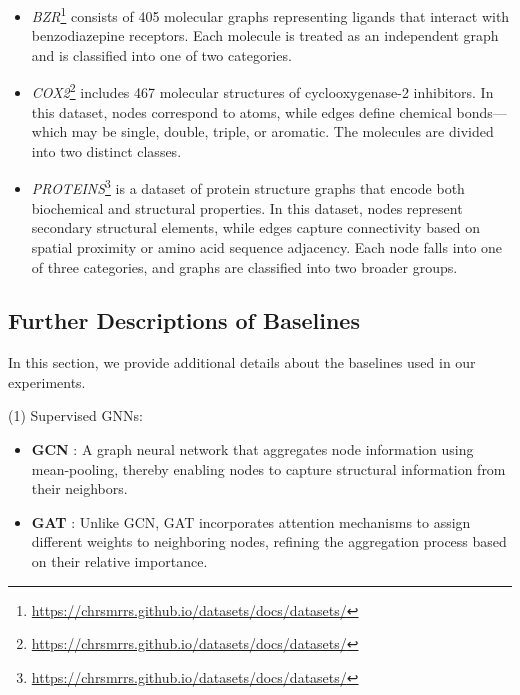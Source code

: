 \begin{itemize}[leftmargin=*]
    \item \emph{BZR}\footnote{\url{https://chrsmrrs.github.io/datasets/docs/datasets/}} \cite{nr} consists of 405 molecular graphs representing ligands that interact with benzodiazepine receptors. Each molecule is treated as an independent graph and is classified into one of two categories.
    
    \item \emph{COX2}\footnote{\url{https://chrsmrrs.github.io/datasets/docs/datasets/}} \cite{nr} includes 467 molecular structures of cyclooxygenase-2 inhibitors. In this dataset, nodes correspond to atoms, while edges define chemical bonds—which may be single, double, triple, or aromatic. The molecules are divided into two distinct classes.
    
    \item \emph{PROTEINS}\footnote{\label{footnote:data}\url{https://chrsmrrs.github.io/datasets/docs/datasets/}} \cite{borgwardt2005protein} is a dataset of protein structure graphs that encode both biochemical and structural properties. In this dataset, nodes represent secondary structural elements, while edges capture connectivity based on spatial proximity or amino acid sequence adjacency. Each node falls into one of three categories, and graphs are classified into two broader groups.
\end{itemize}


\subsection{Further Descriptions of Baselines} \label{app.baselines}
In this section, we provide additional details about the baselines used in our experiments.

\noindent (1) Supervised GNNs:
\begin{itemize}[leftmargin=*]
    \item \textbf{GCN} \cite{kipf2016semi}: A graph neural network that aggregates node information using mean-pooling, thereby enabling nodes to capture structural information from their neighbors.
    \item \textbf{GAT} \cite{velivckovic2017graph}: Unlike GCN, GAT incorporates attention mechanisms to assign different weights to neighboring nodes, refining the aggregation process based on their relative importance.
\end{itemize}

